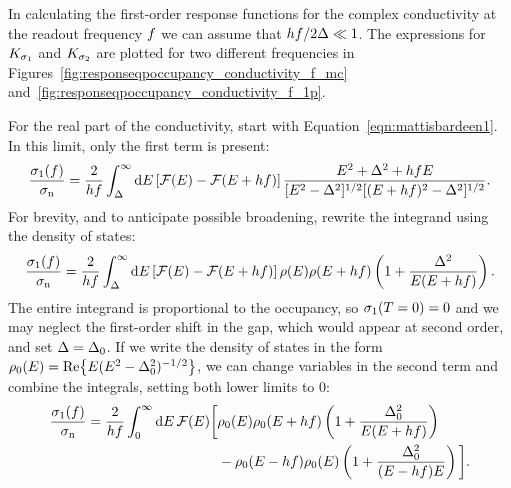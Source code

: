 In calculating the first-order response functions for the complex conductivity at the readout frequency $f$ we can assume that $h f / 2 \Delta \ll 1$.
The expressions for $K_{\sigma_1}$ and $K_{\sigma_2}$ are plotted for two different frequencies in Figures~\ref{fig:responseqpoccupancy_conductivity_f_mc} and~\ref{fig:responseqpoccupancy_conductivity_f_1p}.

For the real part of the conductivity, start with Equation~\ref{eqn:mattisbardeen1}.
In this limit, only the first term is present:
\begin{equation}
\frac{\sigma_1(f)}{\sigma_{\mathrm{n}}}
  =
  \frac{2}{h f} \int_\Delta^\infty \dd{E}
  \left[ \mathcal{F}(E) - \mathcal{F}(E + h f) \right]
  \frac{E^2 + \Delta^2 + h f E}
  {[E^2 - \Delta^2]^{1/2} [(E + h f)^2 - \Delta^2]^{1/2}}.
\label{eqn:mattisbardeen1subgap}
\end{equation}
For brevity, and to anticipate possible broadening, rewrite the integrand using the density of states:
\begin{equation}
\frac{\sigma_1(f)}{\sigma_{\mathrm{n}}}
  =
  \frac{2}{h f} \int_\Delta^\infty \dd{E}
  \left[ \mathcal{F}(E) - \mathcal{F}(E + h f) \right]
  \rho(E) \rho(E + h f)
  \left(1 + \frac{\Delta^2}{E (E + h f)} \right).
\end{equation}
The entire integrand is proportional to the occupancy, so
$\sigma_1(T = 0) = 0$
and we may neglect the first-order shift in the gap, which would appear at second order, and set
$\Delta = \Delta_0$.
If we write the density of states in the form
$\rho_0(E) = \Re{E(E^2 - \Delta_0^2)^{-1/2}}$,
we can change variables in the second term and combine the integrals, setting both lower limits to 0:
\begin{align}
\begin{split}
\frac{\sigma_1(f)}{\sigma_{\mathrm{n}}}
  &=
  \frac{2}{h f} \int_0^\infty \dd{E}
  \mathcal{F}(E)
  \bigg[
  \rho_0(E) \rho_0(E + h f)
  \left(1 + \frac{\Delta_0^2}{E (E + h f)} \right) \\
  &\hspace{1.3in} - \rho_0(E - h f) \rho_0(E)
  \left(1 + \frac{\Delta_0^2}{(E - h f) E} \right)
  \bigg].
\end{split}
\end{align}
